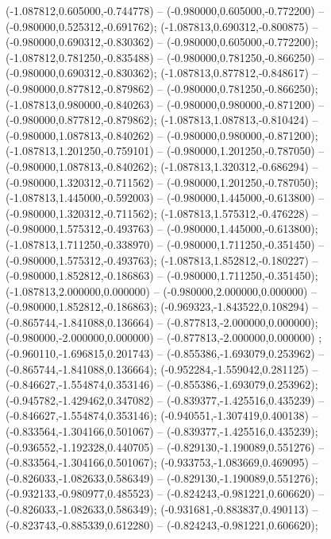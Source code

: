  (-1.087812,0.605000,-0.744778) -- (-0.980000,0.605000,-0.772200) -- (-0.980000,0.525312,-0.691762);
 (-1.087813,0.690312,-0.800875) -- (-0.980000,0.690312,-0.830362) -- (-0.980000,0.605000,-0.772200);
 (-1.087812,0.781250,-0.835488) -- (-0.980000,0.781250,-0.866250) -- (-0.980000,0.690312,-0.830362);
 (-1.087813,0.877812,-0.848617) -- (-0.980000,0.877812,-0.879862) -- (-0.980000,0.781250,-0.866250);
 (-1.087813,0.980000,-0.840263) -- (-0.980000,0.980000,-0.871200) -- (-0.980000,0.877812,-0.879862);
 (-1.087813,1.087813,-0.810424) -- (-0.980000,1.087813,-0.840262) -- (-0.980000,0.980000,-0.871200);
 (-1.087813,1.201250,-0.759101) -- (-0.980000,1.201250,-0.787050) -- (-0.980000,1.087813,-0.840262);
 (-1.087813,1.320312,-0.686294) -- (-0.980000,1.320312,-0.711562) -- (-0.980000,1.201250,-0.787050);
 (-1.087813,1.445000,-0.592003) -- (-0.980000,1.445000,-0.613800) -- (-0.980000,1.320312,-0.711562);
 (-1.087813,1.575312,-0.476228) -- (-0.980000,1.575312,-0.493763) -- (-0.980000,1.445000,-0.613800);
 (-1.087813,1.711250,-0.338970) -- (-0.980000,1.711250,-0.351450) -- (-0.980000,1.575312,-0.493763);
 (-1.087813,1.852812,-0.180227) -- (-0.980000,1.852812,-0.186863) -- (-0.980000,1.711250,-0.351450);
 (-1.087813,2.000000,0.000000) -- (-0.980000,2.000000,0.000000) -- (-0.980000,1.852812,-0.186863);
 (-0.969323,-1.843522,0.108294) -- (-0.865744,-1.841088,0.136664) -- (-0.877813,-2.000000,0.000000);
 (-0.980000,-2.000000,0.000000) -- (-0.877813,-2.000000,0.000000) ;
 (-0.960110,-1.696815,0.201743) -- (-0.855386,-1.693079,0.253962) -- (-0.865744,-1.841088,0.136664);
 (-0.952284,-1.559042,0.281125) -- (-0.846627,-1.554874,0.353146) -- (-0.855386,-1.693079,0.253962);
 (-0.945782,-1.429462,0.347082) -- (-0.839377,-1.425516,0.435239) -- (-0.846627,-1.554874,0.353146);
 (-0.940551,-1.307419,0.400138) -- (-0.833564,-1.304166,0.501067) -- (-0.839377,-1.425516,0.435239);
 (-0.936552,-1.192328,0.440705) -- (-0.829130,-1.190089,0.551276) -- (-0.833564,-1.304166,0.501067);
 (-0.933753,-1.083669,0.469095) -- (-0.826033,-1.082633,0.586349) -- (-0.829130,-1.190089,0.551276);
 (-0.932133,-0.980977,0.485523) -- (-0.824243,-0.981221,0.606620) -- (-0.826033,-1.082633,0.586349);
 (-0.931681,-0.883837,0.490113) -- (-0.823743,-0.885339,0.612280) -- (-0.824243,-0.981221,0.606620);
